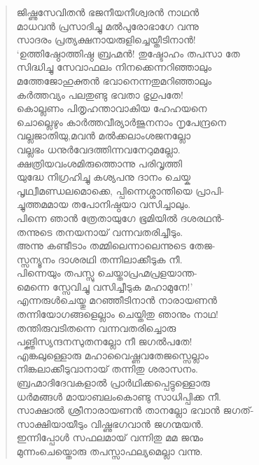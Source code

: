 \begin{verse}
ജിഷ്ണുസേവിതന്‍ ഭജനീയനീശ്വരന്‍ നാഥന്‍\\
മാധവന്‍ പ്രസാദിച്ചു മല്‍പുരോഭാഗേ വന്നു\\
സാദരം പ്രത്യക്ഷനായരുളിച്ചെയ്തീടിനാന്‍!\\
‘ഉത്തിഷ്ഠോത്തിഷ്ഠ ബ്രഹ്മന്‍! തുഷ്ടോഹം തപസാ തേ\\
സിദ്ധിച്ചു സേവാഫലം നിനക്കെന്നറിഞ്ഞാലും\\
മത്തേജോഹുക്തന്‍ ഭവാനെന്നതുമറിഞ്ഞാലും\\
കര്‍ത്തവ്യം പലതുണ്ടു ഭവതാ ഭൃഗുപതേ!\\
കൊല്ലണം പിതൃഹന്താവാകിയ ഹേഹയനെ\\
ചൊല്ലെഴും കാര്‍ത്തവീര്യാര്‍ജുനനാം നൃപേന്ദ്രനെ\\
വല്ലജാതിയു,മവന്‍ മല്‍ക്കലാംശജനല്ലോ\\
വല്ലഭം ധനുര്‍വേദത്തിന്നവനേറുമല്ലോ.\\
ക്ഷത്രിയവംശമിരുത്തൊന്നു പരിവൃത്തി\\
യുദ്ധേ നിഗ്രഹിച്ചു കശ്യപനു ദാനം ചെയ്ക\\
പൃഥ്വീമണ്ഡലമൊക്കെ, പ്പിന്നെശ്ശാന്തിയെ പ്രാപി-\\
ച്ചുത്തമമായ തപോനിഷ്ഠയാ വസിച്ചാലും.\\
പിന്നെ ഞാന്‍ ത്രേതായുഗേ ഭൂമിയില്‍ ദശരഥന്‍-\\
തന്നുടെ തനയനായ് വന്നവതരിച്ചീടും.\\
അന്നു കണ്ടീടാം തമ്മിലെന്നാലെന്നുടെ തേജ-\\
സ്സന്യൂനം ദാശരഥി തന്നിലാക്കീടുക നീ.\\
പിന്നെയും തപസ്സു ചെയ്താപ്രഹ്മപ്രളയാന്ത-\\
മെന്നെ സ്സേവിച്ചു വസിച്ചീടുക മഹാമുനേ!’\\
എന്നരുള്‍ചെയ്തു മറഞ്ഞീടിനാന്‍ നാരായണന്‍\\
തന്നിയോഗങ്ങളെല്ലാം ചെയ്തിതു ഞാനും നാഥ!\\
തന്തിരുവടിതന്നെ വന്നവതരിച്ചൊരു\\
പങ്ക്തിസ്യന്ദനസുതനല്ലോ നീ ജഗല്‍പതേ!\\
എങ്കലുള്ളൊരു മഹാവൈഷ്ണവതേജസ്സെല്ലാം\\
നിങ്കലാക്കീടുവാനായ് തന്നിതു ശരാസനം.\\
ബ്രഹ്മാദിദേവകളാല്‍ പ്രാര്‍ഥിക്കപ്പെട്ടുള്ളൊരു\\
ധര്‍മങ്ങള്‍ മായാബലംകൊണ്ടു സാധിപ്പിക്ക നീ.\\
സാക്ഷാല്‍ ശ്രീനാരായണന്‍ താനല്ലോ ഭവാന്‍ ജഗത്-\\
സാക്ഷിയായീടും വിഷ്ണുഭഗവാന്‍ ജഗന്മയന്‍.\\
ഇന്നിപ്പോള്‍ സഫലമായ് വന്നിതു മമ ജന്മം\\
മുന്നംചെയ്തൊരു തപസ്സാഫല്യമെല്ലാ വന്നു.\\

\end{verse}
